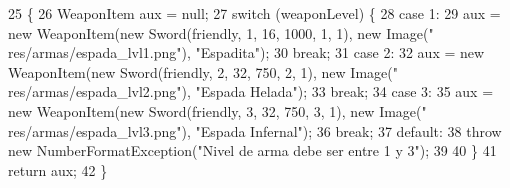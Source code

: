 \begin{DoxyCode}
25                                                                                                            
                   \{
26         WeaponItem aux = null;
27         \textcolor{keywordflow}{switch} (weaponLevel) \{
28             \textcolor{keywordflow}{case} 1:
29                 aux = \textcolor{keyword}{new} WeaponItem(\textcolor{keyword}{new} Sword(friendly, 1, 16, 1000, 1, 1), \textcolor{keyword}{new} Image(\textcolor{stringliteral}{"
      res/armas/espada\_lvl1.png"}), \textcolor{stringliteral}{"Espadita"});
30                 \textcolor{keywordflow}{break};
31             \textcolor{keywordflow}{case} 2:
32                 aux = \textcolor{keyword}{new} WeaponItem(\textcolor{keyword}{new} Sword(friendly, 2, 32, 750, 2, 1), \textcolor{keyword}{new} Image(\textcolor{stringliteral}{"
      res/armas/espada\_lvl2.png"}), \textcolor{stringliteral}{"Espada Helada"});
33                 \textcolor{keywordflow}{break};
34             \textcolor{keywordflow}{case} 3:
35                 aux = \textcolor{keyword}{new} WeaponItem(\textcolor{keyword}{new} Sword(friendly, 3, 32, 750, 3, 1), \textcolor{keyword}{new} Image(\textcolor{stringliteral}{"
      res/armas/espada\_lvl3.png"}), \textcolor{stringliteral}{"Espada Infernal"});
36                 \textcolor{keywordflow}{break};
37             \textcolor{keywordflow}{default}:
38                 \textcolor{keywordflow}{throw} \textcolor{keyword}{new} NumberFormatException(\textcolor{stringliteral}{"Nivel de arma debe ser entre 1 y 3"});
39 
40         \}
41         \textcolor{keywordflow}{return} aux;
42     \}
\end{DoxyCode}
